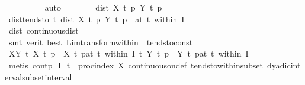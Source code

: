 \begin{isabellebody}
\ \ \ \ \ \ \ \ \isamarkupfalse%
\ auto\isanewline
\ \ \ \ \ \ \isamarkupfalse%
\ {\isachardoublequoteopen}dist\ {\isacharparenleft}{\kern0pt}X\ t\ p{\isacharparenright}{\kern0pt}\ {\isacharparenleft}{\kern0pt}Y\ t\ p{\isacharparenright}{\kern0pt}\ {\isacharequal}{\kern0pt}\ {}{\isachardoublequoteclose}\isanewline
\ \ \ \ \ \ \isamarkupfalse%
\ {\isacharminus}{\kern0pt}\isanewline
\ \ \ \ \ \ \ \ \isamarkupfalse%
\ dist{\isacharunderscore}{\kern0pt}tendsto{\isacharunderscore}{\kern0pt}{}{\isacharcolon}{\kern0pt}\ {\isachardoublequoteopen}{\isacharparenleft}{\kern0pt}{\isacharparenleft}{\kern0pt}{\isasymlambda}t{\isachardot}{\kern0pt}\ dist\ {\isacharparenleft}{\kern0pt}X\ t\ p{\isacharparenright}{\kern0pt}\ {\isacharparenleft}{\kern0pt}Y\ t\ p{\isacharparenright}{\kern0pt}{\isacharparenright}{\kern0pt}\ {\isasymlonglongrightarrow}\ {}{\isacharparenright}{\kern0pt}{\isacharparenleft}{\kern0pt}at\ t\ within\ {\isacharquery}{\kern0pt}I{\isacharparenright}{\kern0pt}{\isachardoublequoteclose}\isanewline
\ \ \ \ \ \ \ \ \ \ \isamarkupfalse%
\ dist{\isacharunderscore}{\kern0pt}{}\ continuous{\isacharunderscore}{\kern0pt}dist\isanewline
\ \ \ \ \ \ \ \ \ \ \isamarkupfalse%
\ {\isacharparenleft}{\kern0pt}smt\ {\isacharparenleft}{\kern0pt}verit{\isacharcomma}{\kern0pt}\ best{\isacharparenright}{\kern0pt}\ Lim{\isacharunderscore}{\kern0pt}transform{\isacharunderscore}{\kern0pt}within\ {\isasymepsilon}\ tendsto{\isacharunderscore}{\kern0pt}const{\isacharparenright}{\kern0pt}\isanewline
\ \ \ \ \ \ \ \ \isamarkupfalse%
\ XY{\isacharcolon}{\kern0pt}\ {\isachardoublequoteopen}{\isacharparenleft}{\kern0pt}{\isacharparenleft}{\kern0pt}{\isasymlambda}t{\isachardot}{\kern0pt}\ X\ t\ p{\isacharparenright}{\kern0pt}\ {\isasymlonglongrightarrow}\ X\ t\ p{\isacharparenright}{\kern0pt}{\isacharparenleft}{\kern0pt}at\ t\ within\ {\isacharquery}{\kern0pt}I{\isacharparenright}{\kern0pt}{\isachardoublequoteclose}\ {\isachardoublequoteopen}{\isacharparenleft}{\kern0pt}{\isacharparenleft}{\kern0pt}{\isasymlambda}t{\isachardot}{\kern0pt}\ Y\ t\ p{\isacharparenright}{\kern0pt}\ {\isasymlonglongrightarrow}\ Y\ t\ p{\isacharparenright}{\kern0pt}{\isacharparenleft}{\kern0pt}at\ t\ within\ {\isacharquery}{\kern0pt}I{\isacharparenright}{\kern0pt}{\isachardoublequoteclose}\isanewline
\ \ \ \ \ \ \ \ \ \ \isamarkupfalse%
\ {\isacharparenleft}{\kern0pt}metis\ cont{\isacharunderscore}{\kern0pt}p\ T{\isacharparenleft}{\kern0pt}{}{\isacharparenright}{\kern0pt}\ {\isacartoucheopen}t\ {\isasymin}\ proc{\isacharunderscore}{\kern0pt}index\ X{\isacartoucheclose}\ continuous{\isacharunderscore}{\kern0pt}on{\isacharunderscore}{\kern0pt}def\ tendsto{\isacharunderscore}{\kern0pt}within{\isacharunderscore}{\kern0pt}subset\ dyadic{\isacharunderscore}{\kern0pt}interval{\isacharunderscore}{\kern0pt}subset{\isacharunderscore}{\kern0pt}interval{\isacharparenright}{\kern0pt}{\isacharplus}{\kern0pt}\isanewline

\end{isabellebody}
